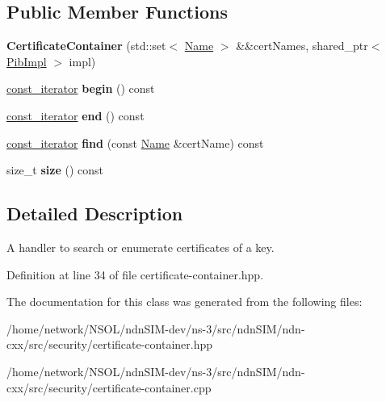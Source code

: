 \subsection*{Public Member Functions}
\begin{DoxyCompactItemize}
\item 
{\bfseries Certificate\+Container} (std\+::set$<$ \hyperlink{classndn_1_1Name}{Name} $>$ \&\&cert\+Names, shared\+\_\+ptr$<$ \hyperlink{classndn_1_1security_1_1PibImpl}{Pib\+Impl} $>$ impl)\hypertarget{classndn_1_1security_1_1CertificateContainer_abf201edf6ca39fd31b78153ed3396e0a}{}\label{classndn_1_1security_1_1CertificateContainer_abf201edf6ca39fd31b78153ed3396e0a}

\item 
\hyperlink{classndn_1_1security_1_1CertificateContainer_1_1const__iterator}{const\+\_\+iterator} {\bfseries begin} () const\hypertarget{classndn_1_1security_1_1CertificateContainer_ab02ee977bc1fa5afb116dd32b8e8589d}{}\label{classndn_1_1security_1_1CertificateContainer_ab02ee977bc1fa5afb116dd32b8e8589d}

\item 
\hyperlink{classndn_1_1security_1_1CertificateContainer_1_1const__iterator}{const\+\_\+iterator} {\bfseries end} () const\hypertarget{classndn_1_1security_1_1CertificateContainer_a333ac7e50f7edaa3952455169f3a66a0}{}\label{classndn_1_1security_1_1CertificateContainer_a333ac7e50f7edaa3952455169f3a66a0}

\item 
\hyperlink{classndn_1_1security_1_1CertificateContainer_1_1const__iterator}{const\+\_\+iterator} {\bfseries find} (const \hyperlink{classndn_1_1Name}{Name} \&cert\+Name) const\hypertarget{classndn_1_1security_1_1CertificateContainer_a2c2181f2582166dfe06e41a679e70803}{}\label{classndn_1_1security_1_1CertificateContainer_a2c2181f2582166dfe06e41a679e70803}

\item 
size\+\_\+t {\bfseries size} () const\hypertarget{classndn_1_1security_1_1CertificateContainer_a2e0050d3db4e6336443c252d47072936}{}\label{classndn_1_1security_1_1CertificateContainer_a2e0050d3db4e6336443c252d47072936}

\end{DoxyCompactItemize}


\subsection{Detailed Description}
A handler to search or enumerate certificates of a key. 

Definition at line 34 of file certificate-\/container.\+hpp.



The documentation for this class was generated from the following files\+:\begin{DoxyCompactItemize}
\item 
/home/network/\+N\+S\+O\+L/ndn\+S\+I\+M-\/dev/ns-\/3/src/ndn\+S\+I\+M/ndn-\/cxx/src/security/certificate-\/container.\+hpp\item 
/home/network/\+N\+S\+O\+L/ndn\+S\+I\+M-\/dev/ns-\/3/src/ndn\+S\+I\+M/ndn-\/cxx/src/security/certificate-\/container.\+cpp\end{DoxyCompactItemize}
